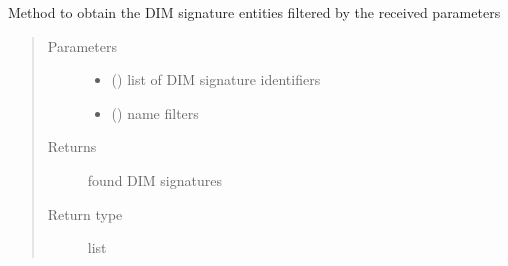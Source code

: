 \begin{fulllineitems}

\begin{fulllineitems}
\label{\detokenize{eboa.engine:eboa.engine.query.Query.get_report_groups}}
Method to obtain the DIM signature entities filtered by the received parameters
\begin{quote}\begin{description}
\item[{Parameters}] \leavevmode\begin{itemize}
\item {} 
 () \textendash{} list of DIM signature identifiers

\item {} 
 () \textendash{} name filters

\end{itemize}

\item[{Returns}] \leavevmode
found DIM signatures

\item[{Return type}] \leavevmode
list

\end{description}\end{quote}

\end{fulllineitems}



\end{fulllineitems}
